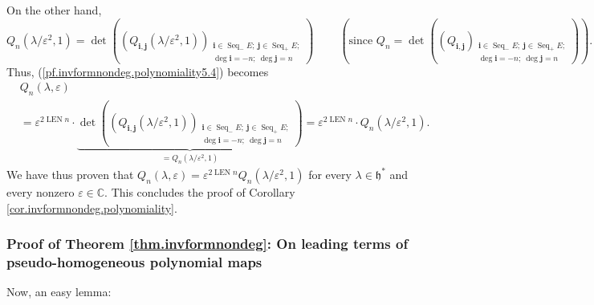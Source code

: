 \documentclass
[numbers=enddot,12pt,final,onecolumn,german,notitlepage]{scrartcl}%
\theoremstyle{definition}
\begin{document}
On the other hand,%
\[
Q_{n}\left(  \lambda/\varepsilon^{2},1\right)  =\det\left(  \left(
Q_{\mathbf{i},\mathbf{j}}\left(  \lambda/\varepsilon^{2},1\right)  \right)
_{\substack{\mathbf{i}\in\operatorname*{Seq}\nolimits_{-}E;\ \mathbf{j}%
\in\operatorname*{Seq}\nolimits_{+}E;\\\deg\mathbf{i}=-n;\ \deg\mathbf{j}%
=n}}\right)  \ \ \ \ \ \ \ \ \ \ \left(  \text{since }Q_{n}=\det\left(
\left(  Q_{\mathbf{i},\mathbf{j}}\right)  _{\substack{\mathbf{i}%
\in\operatorname*{Seq}\nolimits_{-}E;\ \mathbf{j}\in\operatorname*{Seq}%
\nolimits_{+}E;\\\deg\mathbf{i}=-n;\ \deg\mathbf{j}=n}}\right)  \right)  .
\]
Thus, (\ref{pf.invformnondeg.polynomiality5.4}) becomes%
\begin{align*}
&  Q_{n}\left(  \lambda,\varepsilon\right) \\
&  =\varepsilon^{2\operatorname*{LEN}n}\cdot\underbrace{\det\left(  \left(
Q_{\mathbf{i},\mathbf{j}}\left(  \lambda/\varepsilon^{2},1\right)  \right)
_{\substack{\mathbf{i}\in\operatorname*{Seq}\nolimits_{-}E;\ \mathbf{j}%
\in\operatorname*{Seq}\nolimits_{+}E;\\\deg\mathbf{i}=-n;\ \deg\mathbf{j}%
=n}}\right)  }_{=Q_{n}\left(  \lambda/\varepsilon^{2},1\right)  }%
=\varepsilon^{2\operatorname*{LEN}n}\cdot Q_{n}\left(  \lambda/\varepsilon
^{2},1\right)  .
\end{align*}
We have thus proven that $Q_{n}\left(  \lambda,\varepsilon\right)
=\varepsilon^{2\operatorname*{LEN}n}Q_{n}\left(  \lambda/\varepsilon
^{2},1\right)  $ for every $\lambda\in\mathfrak{h}^{\ast}$ and every nonzero
$\varepsilon\in\mathbb{C}$. This concludes the proof of Corollary
\ref{cor.invformnondeg.polynomiality}.

\subsubsection{Proof of Theorem \ref{thm.invformnondeg}: On leading terms of
pseudo-homogeneous polynomial maps}

Now, an easy lemma:
\end{document}
